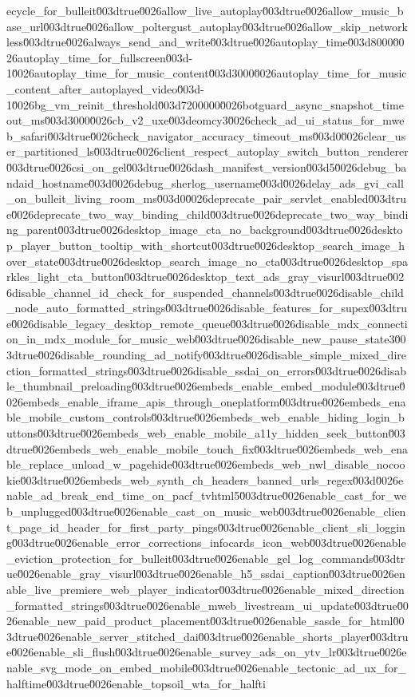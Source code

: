 {ecycle_for_bulleit\u003dtrue\u0026allow_live_autoplay\u003dtrue\u0026allow_music_base_url\u003dtrue\u0026allow_poltergust_autoplay\u003dtrue\u0026allow_skip_networkless\u003dtrue\u0026always_send_and_write\u003dtrue\u0026autoplay_time\u003d8000\u0026autoplay_time_for_fullscreen\u003d-1\u0026autoplay_time_for_music_content\u003d3000\u0026autoplay_time_for_music_content_after_autoplayed_video\u003d-1\u0026bg_vm_reinit_threshold\u003d7200000\u0026botguard_async_snapshot_timeout_ms\u003d3000\u0026cb_v2_uxe\u003deomcy3\u0026check_ad_ui_status_for_mweb_safari\u003dtrue\u0026check_navigator_accuracy_timeout_ms\u003d0\u0026clear_user_partitioned_ls\u003dtrue\u0026client_respect_autoplay_switch_button_renderer\u003dtrue\u0026csi_on_gel\u003dtrue\u0026dash_manifest_version\u003d5\u0026debug_bandaid_hostname\u003d\u0026debug_sherlog_username\u003d\u0026delay_ads_gvi_call_on_bulleit_living_room_ms\u003d0\u0026deprecate_pair_servlet_enabled\u003dtrue\u0026deprecate_two_way_binding_child\u003dtrue\u0026deprecate_two_way_binding_parent\u003dtrue\u0026desktop_image_cta_no_background\u003dtrue\u0026desktop_player_button_tooltip_with_shortcut\u003dtrue\u0026desktop_search_image_hover_state\u003dtrue\u0026desktop_search_image_no_cta\u003dtrue\u0026desktop_sparkles_light_cta_button\u003dtrue\u0026desktop_text_ads_gray_visurl\u003dtrue\u0026disable_channel_id_check_for_suspended_channels\u003dtrue\u0026disable_child_node_auto_formatted_strings\u003dtrue\u0026disable_features_for_supex\u003dtrue\u0026disable_legacy_desktop_remote_queue\u003dtrue\u0026disable_mdx_connection_in_mdx_module_for_music_web\u003dtrue\u0026disable_new_pause_state3\u003dtrue\u0026disable_rounding_ad_notify\u003dtrue\u0026disable_simple_mixed_direction_formatted_strings\u003dtrue\u0026disable_ssdai_on_errors\u003dtrue\u0026disable_thumbnail_preloading\u003dtrue\u0026embeds_enable_embed_module\u003dtrue\u0026embeds_enable_iframe_apis_through_oneplatform\u003dtrue\u0026embeds_enable_mobile_custom_controls\u003dtrue\u0026embeds_web_enable_hiding_login_buttons\u003dtrue\u0026embeds_web_enable_mobile_a11y_hidden_seek_button\u003dtrue\u0026embeds_web_enable_mobile_touch_fix\u003dtrue\u0026embeds_web_enable_replace_unload_w_pagehide\u003dtrue\u0026embeds_web_nwl_disable_nocookie\u003dtrue\u0026embeds_web_synth_ch_headers_banned_urls_regex\u003d\u0026enable_ad_break_end_time_on_pacf_tvhtml5\u003dtrue\u0026enable_cast_for_web_unplugged\u003dtrue\u0026enable_cast_on_music_web\u003dtrue\u0026enable_client_page_id_header_for_first_party_pings\u003dtrue\u0026enable_client_sli_logging\u003dtrue\u0026enable_error_corrections_infocards_icon_web\u003dtrue\u0026enable_eviction_protection_for_bulleit\u003dtrue\u0026enable_gel_log_commands\u003dtrue\u0026enable_gray_visurl\u003dtrue\u0026enable_h5_ssdai_caption\u003dtrue\u0026enable_live_premiere_web_player_indicator\u003dtrue\u0026enable_mixed_direction_formatted_strings\u003dtrue\u0026enable_mweb_livestream_ui_update\u003dtrue\u0026enable_new_paid_product_placement\u003dtrue\u0026enable_sasde_for_html\u003dtrue\u0026enable_server_stitched_dai\u003dtrue\u0026enable_shorts_player\u003dtrue\u0026enable_sli_flush\u003dtrue\u0026enable_survey_ads_on_ytv_lr\u003dtrue\u0026enable_svg_mode_on_embed_mobile\u003dtrue\u0026enable_tectonic_ad_ux_for_halftime\u003dtrue\u0026enable_topsoil_wta_for_halfti}
